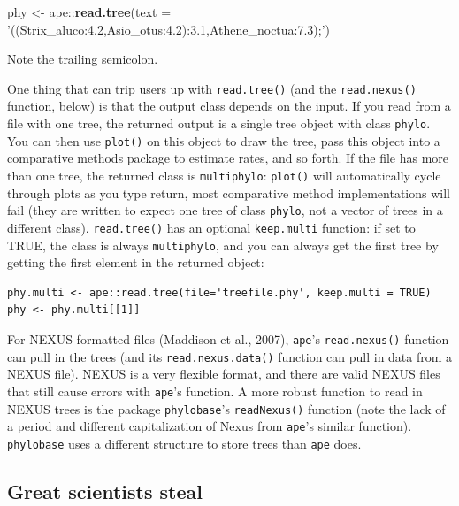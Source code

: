 \documentclass[]{book}
\newenvironment{Shaded}{\begin{snugshade}}{\end{snugshade}}
\newcommand{\KeywordTok}[1]{\textcolor[rgb]{0.13,0.29,0.53}{\textbf{{#1}}}}
\newcommand{\DataTypeTok}[1]{\textcolor[rgb]{0.13,0.29,0.53}{{#1}}}
\newcommand{\StringTok}[1]{\textcolor[rgb]{0.31,0.60,0.02}{{#1}}}
\newcommand{\NormalTok}[1]{{#1}}
\theoremstyle{definition}
\theoremstyle{definition}
\theoremstyle{remark}
\begin{document}
\begin{Shaded}
\begin{Highlighting}[]
\NormalTok{phy <-}\StringTok{ }\NormalTok{ape::}\KeywordTok{read.tree}\NormalTok{(}\DataTypeTok{text =} \StringTok{'((Strix_aluco:4.2,Asio_otus:4.2):3.1,Athene_noctua:7.3);'}\NormalTok{)}
\end{Highlighting}
\end{Shaded}

Note the trailing semicolon.

One thing that can trip users up with \texttt{read.tree()} (and the
\texttt{read.nexus()} function, below) is that the output class depends
on the input. If you read from a file with one tree, the returned output
is a single tree object with class \texttt{phylo}. You can then use
\texttt{plot()} on this object to draw the tree, pass this object into a
comparative methods package to estimate rates, and so forth. If the file
has more than one tree, the returned class is \texttt{multiphylo}:
\texttt{plot()} will automatically cycle through plots as you type
return, most comparative method implementations will fail (they are
written to expect one tree of class \texttt{phylo}, not a vector of
trees in a different class). \texttt{read.tree()} has an optional
\texttt{keep.multi} function: if set to TRUE, the class is always
\texttt{multiphylo}, and you can always get the first tree by getting
the first element in the returned object:

\begin{verbatim}
phy.multi <- ape::read.tree(file='treefile.phy', keep.multi = TRUE)
phy <- phy.multi[[1]]
\end{verbatim}

For NEXUS formatted files (Maddison et al., 2007), \texttt{ape}'s
\texttt{read.nexus()} function can pull in the trees (and its
\texttt{read.nexus.data()} function can pull in data from a NEXUS file).
NEXUS is a very flexible format, and there are valid NEXUS files that
still cause errors with \texttt{ape}'s function. A more robust function
to read in NEXUS trees is the package \texttt{phylobase}'s
\texttt{readNexus()} function (note the lack of a period and different
capitalization of Nexus from \texttt{ape}'s similar function).
\texttt{phylobase} uses a different structure to store trees than
\texttt{ape} does.

\subsection{Great scientists steal}\label{great-scientists-steal}
\end{document}
